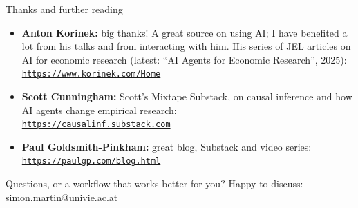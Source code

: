 \documentclass[aspectratio=169,11pt]{beamer}
\makeatletter
\newcommand{\email}{\mbox{\href{mailto:simon.martin@univie.ac.at}{simon.martin@univie.ac.at}}}
\newcommand{\icon}[1]{\textcolor{accent}{#1}}
\newcommand{\link}[1]{\href{#1}{\textcolor{accent}{\nolinkurl{#1}}}}
\makeatother
\begin{document}
\begin{frame}{Thanks and further reading}
  \begin{itemize}
    \item \textbf{Anton Korinek:} big thanks! A great source on using AI; I have benefited a lot from his talks and from interacting with him. His series of JEL articles on AI for economic research (latest: ``AI Agents for Economic Research'', 2025):\\
    \link{https://www.korinek.com/Home}
    \item \textbf{Scott Cunningham:} Scott's Mixtape Substack, on causal inference and how AI agents change empirical research:\\
    \link{https://causalinf.substack.com}
    \item \textbf{Paul Goldsmith-Pinkham:} great blog, Substack and video series:\\
    \link{https://paulgp.com/blog.html}
  \end{itemize}
  \vspace{0.8em}
  \begin{keybox}
    \icon{\faComments}\enspace Questions, or a workflow that works better for you? Happy to discuss: \email
  \end{keybox}
\end{frame}
\end{document}
